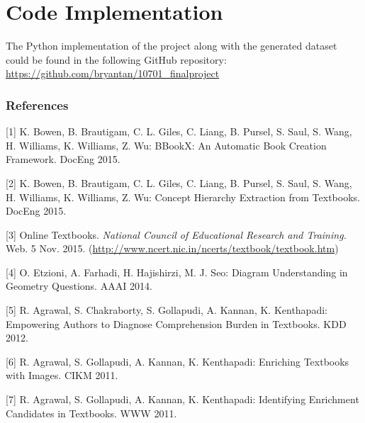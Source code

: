 \documentclass{article} %
\begin{document}
\section{Code Implementation}

The Python implementation of the project along with the generated dataset could be found in the following GitHub repository: \url{https://github.com/bryantan/10701\_finalproject}

\subsubsection*{References}

[1] K. Bowen, B. Brautigam, C. L. Giles, C. Liang, B. Pursel, S. Saul, S. Wang, H. Williams, K. Williams, Z. Wu: BBookX: An Automatic Book Creation Framework. DocEng 2015.

[2] K. Bowen, B. Brautigam, C. L. Giles, C. Liang, B. Pursel, S. Saul, S. Wang, H. Williams, K. Williams, Z. Wu: Concept Hierarchy Extraction from Textbooks. DocEng 2015.

[3] Online Textbooks. {\it National Council of Educational Research and Training.} Web. 5 Nov. 2015. (\url{http://www.ncert.nic.in/ncerts/textbook/textbook.htm})

[4] O. Etzioni, A. Farhadi, H. Hajishirzi, M. J. Seo: Diagram Understanding in Geometry Questions. AAAI 2014.

[5] R. Agrawal, S. Chakraborty, S. Gollapudi, A. Kannan, K. Kenthapadi: Empowering Authors to Diagnose Comprehension Burden in Textbooks. KDD 2012.

[6] R. Agrawal, S. Gollapudi, A. Kannan, K. Kenthapadi: Enriching Textbooks with Images. CIKM 2011. 

[7] R. Agrawal, S. Gollapudi, A. Kannan, K. Kenthapadi: Identifying Enrichment Candidates in Textbooks. WWW 2011.
\end{document}

